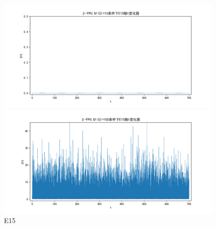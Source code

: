 \documentclass[10pt, a4paper]{article}
\begin{document}
    \begin{figure}[H]
        \begin{minipage}[t]{0.49\textwidth}
            \centering
            \includegraphics[width=\textwidth]{./q6_pics/cmp/E15.png}
        \end{minipage}
        \begin{minipage}[t]{0.49\textwidth}
            \centering
            \includegraphics[width=\textwidth]{./q6_pics/exp/E15.png}
        \end{minipage}
        \caption{E15}\label{fig:E15 in q6}
    \end{figure}
\end{document}
